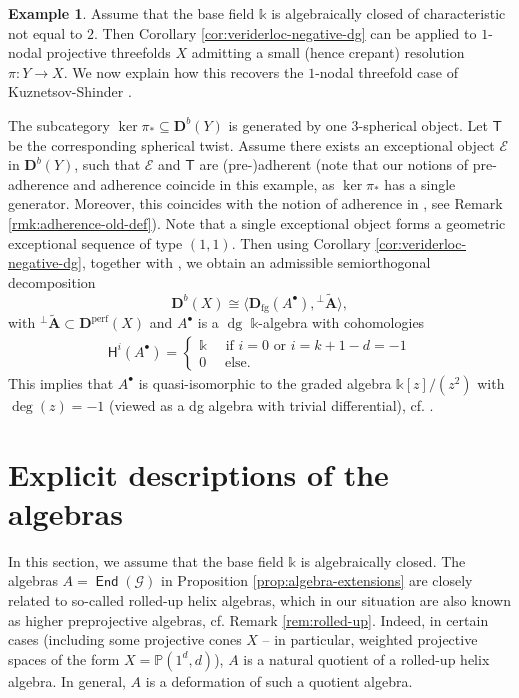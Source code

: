 \documentclass[a4paper,11pt, reqno]{amsart}
\def\P{\mathbb P}
\def\AA{\mathbf A}
\def\DD{\mathbf D}
\def\sE{\mathscr{E}}
\def\sG{\mathscr{G}}
\def\dg{{\operatorname{dg}}}
\newcommand{\opname}[1]{\operatorname{\mathsf{#1}}}
\newcommand{\End}{\opname{End}}
\def\Db{\DD^b}
\def\Dperf{\DD^{\mathrm{perf}}}
\newcommand{\bH}{\mathsf{H}}
\newcommand{\bT}{\mathsf{T}}
\theoremstyle{plain}
\theoremstyle{definition}
\newtheorem{example}[dummy]{Example}
\numberwithin{equation}{section}
\begin{document}
\begin{example}\label{ex:nodal-ks}
Assume that the base field $\mathbb{k}$ is algebraically closed of characteristic not equal to $2$.
Then Corollary \ref{cor:veriderloc-negative-dg} can be applied to $1$-nodal projective threefolds $X$ admitting a small (hence crepant) resolution $\pi \colon Y \to X$. We now explain how this recovers the $1$-nodal threefold case of Kuznetsov-Shinder \cite[Theorem 6.17 (i)]{ks}.


 The subcategory $\ker\pi_\ast \subseteq \Db(Y)$ is generated by one $3$-spherical object. Let $\bT$ be the corresponding spherical twist.
Assume there exists an exceptional object $\sE$ in $\Db(Y)$, such that $\sE$ and $\bT$ are (pre-)adherent (note that our notions of pre-adherence and adherence coincide in this example, as $\ker\pi_\ast$ has a single generator. Moreover, this coincides with the notion of adherence in \cite[Definition 3.9]{ks}, see Remark \ref{rmk:adherence-old-def}).
Note that a single exceptional object forms a geometric exceptional sequence of type $(1,1)$.
Then using Corollary \ref{cor:veriderloc-negative-dg}, together with \cite[Corollary 5.6 and Lemma 5.7]{ks}, we obtain  an admissible semiorthogonal decomposition 
\[
\Db(X) \cong \langle \DD_{\mathrm{fg}} ( A^\bullet ) , {{^\perp}\tilde{\AA}} \rangle ,
\]
with ${{^\perp}\tilde{\AA}} \subset \Dperf ( X )$ and $A^\bullet$ is a $\dg$ $\mathbb k$-algebra with cohomologies 
\begin{align}
    \bH^i(A^\bullet)=\begin{cases}
        \mathbb{k} \quad \text{ if } i=0 \text{ or } i=k+1-d=-1  \\
        0  \quad \text{ else}.
    \end{cases}
\end{align}
This implies that $A^\bullet$ is quasi-isomorphic to the graded algebra $\mathbb{k}[z] / (z^2)$ with $\deg(z) =-1$ (viewed as a dg algebra with trivial differential), cf. \cite[Theorem 2.1.]{KellerYangZhou}.
\end{example}






\section{Explicit descriptions of the algebras }\label{sec:algebra-description}

In this section, we assume that the base field $\mathbb{k}$ is algebraically closed.
The algebras $A=\End(\sG)$ in Proposition \ref{prop:algebra-extensions} are closely related to so-called rolled-up helix algebras, which in our situation are also known as higher preprojective algebras, cf. Remark \ref{rem:rolled-up}. Indeed, in certain cases (including some projective cones $X$ -- in particular, weighted projective spaces of the form $X=\P(1^d, d)$), $A$ is a natural quotient of a rolled-up helix algebra. In general, $A$ is a deformation of such a quotient algebra. 
\end{document}
